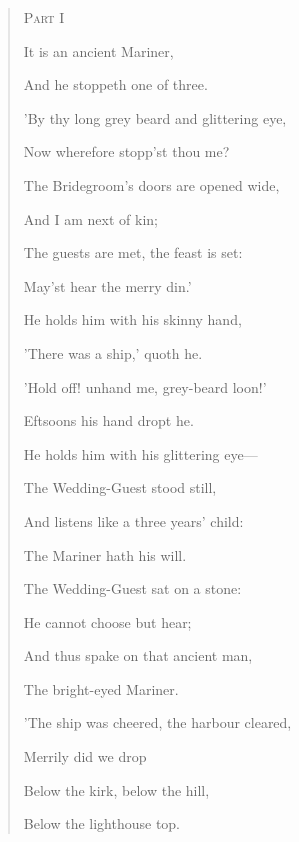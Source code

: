 \documentclass[12pt]{book}
\begin{document}
\begin{verse}

\vspace*{0.5in}

{\LARGE\textsc{Part I}}

\vspace{0.8in}

It is an ancient Mariner,

And he stoppeth one of three.

\medskip

'By thy long grey beard and glittering eye,

Now wherefore stopp'st thou me?

\bigskip

The Bridegroom's doors are opened wide,

And I am next of kin;

The guests are met, the feast is set:

May'st hear the merry din.'

\bigskip
\bigskip

He holds him with his skinny hand,

'There was a ship,' quoth he.

\medskip

'Hold off! unhand me, grey-beard loon!'

Eftsoons his hand dropt he.

\bigskip
\bigskip

He holds him with his glittering eye—

The Wedding-Guest stood still,

\medskip

And listens like a three years' child:

The Mariner hath his will.

\clearpage

The Wedding-Guest sat on a stone:

He cannot choose but hear;

\medskip

And thus spake on that ancient man,

The bright-eyed Mariner.

\bigskip
\bigskip
\bigskip

'The ship was cheered, the harbour cleared,

Merrily did we drop

Below the kirk, below the hill,

Below the lighthouse top.

\bigskip


\end{verse}
\end{document}
